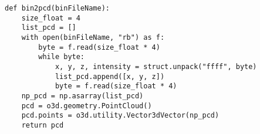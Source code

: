 \begin{lstlisting}
def bin2pcd(binFileName):
    size_float = 4
    list_pcd = []
    with open(binFileName, "rb") as f:
        byte = f.read(size_float * 4)
        while byte:
            x, y, z, intensity = struct.unpack("ffff", byte)
            list_pcd.append([x, y, z])
            byte = f.read(size_float * 4)
    np_pcd = np.asarray(list_pcd)
    pcd = o3d.geometry.PointCloud()
    pcd.points = o3d.utility.Vector3dVector(np_pcd)
    return pcd
\end{lstlisting}